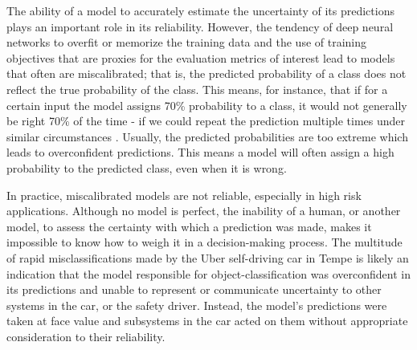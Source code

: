 The ability of a model to accurately estimate the uncertainty of its predictions plays an important role in its reliability. However, the tendency of deep neural networks to overfit or memorize the training data \parencite{arpit_closer_2017, burg_memorization_2021} and the use of training objectives that are proxies for the evaluation metrics of interest lead to models that often are miscalibrated; that is, the predicted probability of a class does not reflect the true probability of the class. This means, for instance, that if for a certain input the model assigns 70\% probability to a class, it would not generally be right 70\% of the time - if we could repeat the prediction multiple times under similar circumstances \parencite{guo_calibration_2017, kull_temperature_2019}. Usually, the predicted probabilities are too extreme which leads to overconfident predictions. This means a model will often assign a high probability to the predicted class, even when it is wrong. 

In practice, miscalibrated models are not reliable, especially in high risk applications. Although no model is perfect, the inability of a human, or another model, to assess the certainty with which a prediction was made, makes it impossible to know how to weigh it in a decision-making process. 
The multitude of rapid misclassifications made by the Uber self-driving car in Tempe is likely an indication that the model responsible for object-classification was overconfident in its predictions and unable to represent or communicate uncertainty to other systems in the car, or the safety driver. Instead, the model's predictions were taken at face value and subsystems in the car acted on them without appropriate consideration to their reliability.


